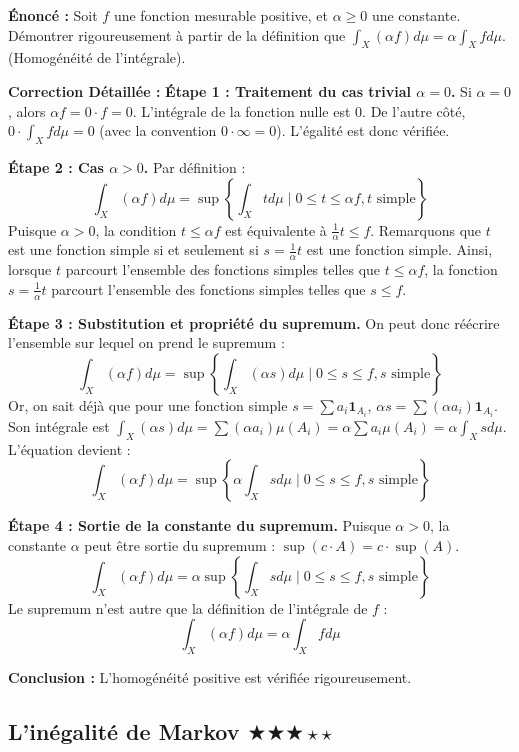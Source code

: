 \documentclass[11pt,a4paper]{article}
\begin{document}
\textbf{Énonc\'e :}
Soit $f$ une fonction mesurable positive, et $\alpha \ge 0$ une constante.
D\'emontrer rigoureusement \`a partir de la d\'efinition que $\int_X (\alpha f) d\mu = \alpha \int_X f d\mu$.
(Homog\'en\'eit\'e de l'int\'egrale).

\textbf{Correction D\'etaill\'ee :}
\textbf{Étape 1 : Traitement du cas trivial $\alpha = 0$.}
Si $\alpha = 0$, alors $\alpha f = 0 \cdot f = 0$.
L'int\'egrale de la fonction nulle est $0$.
De l'autre côt\'e, $0 \cdot \int_X f d\mu = 0$ (avec la convention $0 \cdot \infty = 0$).
L'\'egalit\'e est donc v\'erifi\'ee.

\textbf{Étape 2 : Cas $\alpha > 0$.}
Par d\'efinition :
$$\int_X (\alpha f) d\mu = \sup \left\{ \int_X t d\mu \mid 0 \le t \le \alpha f, t \text{ simple} \right\}$$
Puisque $\alpha > 0$, la condition $t \le \alpha f$ est \'equivalente \`a $\frac{1}{\alpha} t \le f$.
Remarquons que $t$ est une fonction simple si et seulement si $s = \frac{1}{\alpha} t$ est une fonction simple.
Ainsi, lorsque $t$ parcourt l'ensemble des fonctions simples telles que $t \le \alpha f$, la fonction $s = \frac{1}{\alpha} t$ parcourt l'ensemble des fonctions simples telles que $s \le f$.

\textbf{Étape 3 : Substitution et propri\'et\'e du supremum.}
On peut donc r\'e\'ecrire l'ensemble sur lequel on prend le supremum :
$$\int_X (\alpha f) d\mu = \sup \left\{ \int_X (\alpha s) d\mu \mid 0 \le s \le f, s \text{ simple} \right\}$$
Or, on sait d\'ej\`a que pour une fonction simple $s = \sum a_i \mathbf{1}_{A_i}$, $\alpha s = \sum (\alpha a_i) \mathbf{1}_{A_i}$.
Son int\'egrale est $\int_X (\alpha s) d\mu = \sum (\alpha a_i) \mu(A_i) = \alpha \sum a_i \mu(A_i) = \alpha \int_X s d\mu$.
L'\'equation devient :
$$\int_X (\alpha f) d\mu = \sup \left\{ \alpha \int_X s d\mu \mid 0 \le s \le f, s \text{ simple} \right\}$$

\textbf{Étape 4 : Sortie de la constante du supremum.}
Puisque $\alpha > 0$, la constante $\alpha$ peut \^etre sortie du supremum : $\sup(c \cdot A) = c \cdot \sup(A)$.
$$\int_X (\alpha f) d\mu = \alpha \sup \left\{ \int_X s d\mu \mid 0 \le s \le f, s \text{ simple} \right\}$$
Le supremum n'est autre que la d\'efinition de l'int\'egrale de $f$ :
$$\int_X (\alpha f) d\mu = \alpha \int_X f d\mu$$

\textbf{Conclusion :}
L'homog\'en\'eit\'e positive est v\'erifi\'ee rigoureusement.


\subsection*{L'in\'egalit\'e de Markov \quad $\bigstar\bigstar\bigstar\star\star$}
\end{document}
